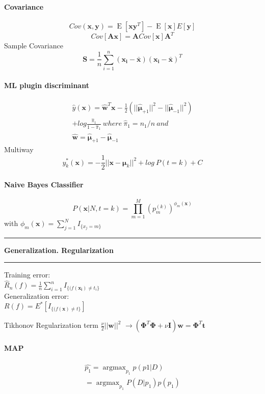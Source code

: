 \documentclass[7pt]{scrartcl}
\newlength{\secskip}
\renewcommand{\section}[1]{
  \vspace{\secskip}
  \hrule\vspace{.4em}
  \textbf{#1}
  \vspace{.4em}
  \hrule
  \vspace{\secskip}
}
\DeclareMathOperator*{\argmax}{argmax}
\DeclareMathOperator{\E}{E}
\renewcommand{\vec}{\mathbf}
\begin{document}
\begin{multicols}{4}
\paragraph{Covariance}
$$Cov(\vec x, \vec y) = \E[\vec x \vec y ^ T] - \E[\vec x]E[\vec y]$$
$$Cov[\vec A \vec x] = \vec A Cov[\vec x] \vec A^T$$
Sample Covariance 
\[\vec{S} = \frac{1}{n} \sum_{i=1}^n (\vec{x_i - \bar{x}})(\vec{x_i - \bar{x}})^T\]
\paragraph{ML plugin discriminant}
\begin{equation*}
\begin{split}
\hat{y}(\vec{x}) = \hat{\vec{w}}^T \vec{x} - \frac{1}{2}(||\hat{\vec{\mu}}_{+1} ||^2 - || \hat{\vec{\mu}}_{-1} ||^2) \\ + log\frac{\hat{\pi}_1}{1-\hat{\pi}_1} ~ where~ \hat{\pi}_1 = n_1 / n ~ and~  \\ \hat{\vec{w}}=\hat{\vec{\mu}}_{+1} - \hat{\vec{\mu}}_{-1}
\end{split}
\end{equation*}
Multiway \[y_k^*(\vec{x}) = -\frac{1}{2}||\vec{x}-\vec{\mu}_k||^2 + log~P(t=k) + C\]

\paragraph{Naive Bayes Classifier}
\[ P(\vec x | N,t=k) = \prod_{m=1}^M \left ( p_m^{(k)} \right
)^{\phi_m(\vec x)} \]
with $\phi_m(\vec x) = \sum_{j=1}^N I_{\{x_j = m\}}$

\section{Generalization. Regularization}
Training error: \\
$\hat{R}_n(f) = \frac{1}{n} \sum_{i=1}^n I_{\{(f(\vec{x_i}) \neq t_i\}}$ \\
Generalization error: \\
$R(f) = E^*[I_{\{(f(\vec{x}) \neq t\}}]$

Tikhonov Regularization term $\frac{\nu}{2} ||\vec{w}||^2$
$\rightarrow (\vec{\Phi}^T \vec{\Phi} + \nu \vec{I})\vec{w} = \vec{\Phi}^T \vec{t}$

\paragraph{MAP}
\begin{align*}
\hat{p_1} = \argmax_{p_1} p(p1|D) \\
= \argmax_{p_1} P(D|p_1)p(p_1)
\end{align*}

\end{multicols}
\end{document}
